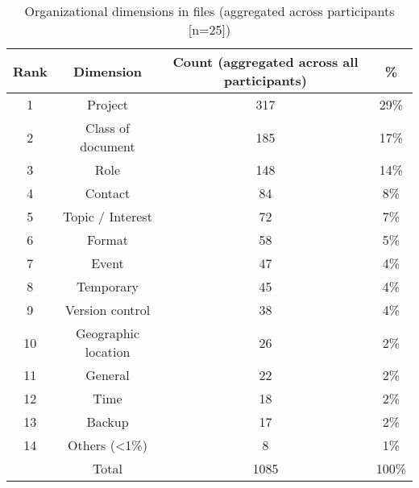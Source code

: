 \begin{table}[btp]
\begin{center}
\begin{footnotesize}
\setlength{\extrarowheight}{2pt}
\begin{tabular}{|c|c|c|c|}
\hline
{\bf Rank} & {\bf Dimension} & {\bf Count (aggregated across all participants)} &   {\bf \%} \\
\hline
         1 &    Project &        317 &       29\% \\
\hline
         2 & Class of document &        185 &       17\% \\
\hline
         3 &       Role &        148 &       14\% \\
\hline
         4 &    Contact &         84 &        8\% \\
\hline
         5 & Topic / Interest &         72 &        7\% \\
\hline
         6 &     Format &         58 &        5\% \\
\hline
         7 &      Event &         47 &        4\% \\
\hline
         8 &  Temporary &         45 &        4\% \\
\hline
         9 & Version control &         38 &        4\% \\
\hline
        10 & Geographic location &         26 &        2\% \\
\hline
        11 &    General &         22 &        2\% \\
\hline
        12 &       Time &         18 &        2\% \\
\hline
        13 &     Backup &         17 &        2\% \\
\hline
        14 & Others (<1\%) &          8 &        1\% \\
\hline
           &      Total &       1085 &      100\% \\
\hline
\end{tabular}  
\end{footnotesize}
\caption{Organizational dimensions in files (aggregated across participants [n=25])}
\label{table:exp-study:file-org-dims}
\end{center}
\end{table}

